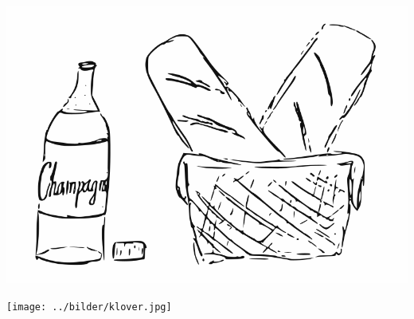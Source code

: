 
\begin{intersong}
	\begin{center}
		\includegraphics[scale=0.5]{../bilder/batongochvin.png} 
	\end{center}
\end{intersong}
\sclearpage


\begin{intersong}
	\begin{center}
		\texttt{[image: ../bilder/klover.jpg]} 
	\end{center}
\end{intersong}
